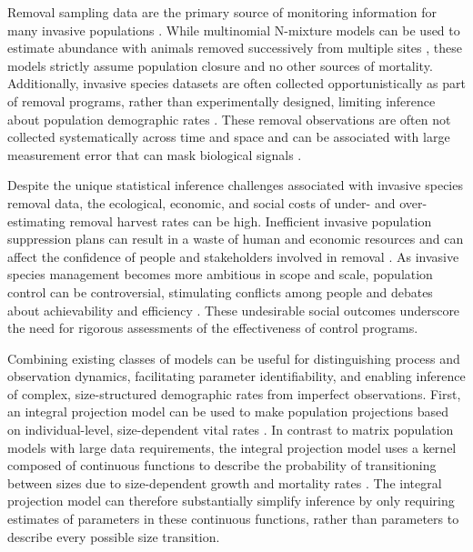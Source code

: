\documentclass{article}
\begin{document}
Removal sampling data are the primary source of monitoring information for many invasive populations \parencite{udell2022open}. While multinomial N-mixture models can be used to estimate abundance with animals removed successively from multiple sites \parencite{dorazio2005improving}, these models strictly assume population closure and no other sources of mortality. Additionally, invasive species datasets are often collected opportunistically as part of removal programs, rather than experimentally designed, limiting inference about population demographic rates \parencite{tiberti2021alien, crall2010improving, rogosch2021comparing}. These removal observations are often not collected systematically across time and space and can be associated with large measurement error that can mask biological signals \parencite{auger2016state, sibert2003horizontal, katsanevakis2012monitoring}.

Despite the unique statistical inference challenges associated with invasive species removal data, the ecological, economic, and social costs of under- and over-estimating removal harvest rates can be high. Inefficient invasive population suppression plans can result in a waste of human and economic resources and can affect the confidence of people and stakeholders involved in removal \parencite{tiberti2021alien}. As invasive species management becomes more ambitious in scope and scale, population control can be controversial, stimulating conflicts among people and debates about achievability and efficiency \parencite{crowley2017conflict}. These undesirable social outcomes underscore the need for rigorous assessments of the effectiveness of control programs.

Combining existing classes of models can be useful for distinguishing process and observation dynamics, facilitating parameter identifiability, and enabling inference of complex, size-structured demographic rates from imperfect observations. First, an integral projection model can be used to make population projections based on individual-level, size-dependent vital rates \parencite{merow2014advancing, rees2014building}. In contrast to matrix population models with large data requirements, the integral projection model uses a kernel composed of continuous functions to describe the probability of transitioning between sizes due to size-dependent growth and mortality rates \parencite{ellner2006integral}. The integral projection model can therefore substantially simplify inference by only requiring estimates of parameters in these continuous functions, rather than parameters to describe every possible size transition. 
\end{document}
